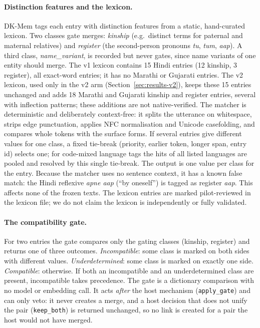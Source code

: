 \paragraph{Distinction features and the lexicon.} DK-Mem tags each entry with distinction features from a static, hand-curated lexicon. Two classes gate
merges: \emph{kinship} (e.g.\ distinct terms for paternal and maternal relatives) and \emph{register} (the second-person pronouns \emph{tu}, \emph{tum}, \emph{aap}).
A third class, \emph{name\_variant}, is recorded but never gates, since name variants of one entity should merge. The v1 lexicon contains 15 Hindi entries
(12 kinship, 3 register), all exact-word entries; it has no Marathi or Gujarati entries. The v2 lexicon, used only in the v2 arm
(Section~\ref{sec:results-v2}), keeps these 15 entries unchanged and adds 18 Marathi and Gujarati kinship and register entries, several with
inflection patterns; these additions are not native-verified. The matcher is deterministic and deliberately context-free: it
splits the utterance on whitespace, strips edge punctuation, applies NFC normalisation and Unicode casefolding, and compares whole tokens with the surface forms.
If several entries give different values for one class, a fixed tie-break (priority, earlier token, longer span, entry id) selects one; for code-mixed language
tags the hits of all listed languages are pooled and resolved by this single tie-break. The output is one value per class for the entry.
Because the matcher uses no sentence context, it has a known false match: the Hindi reflexive \emph{apne aap} (``by oneself'') is tagged as register \emph{aap}.
This affects none of the frozen texts. The lexicon entries are marked pilot-reviewed in the lexicon file; we do not claim the lexicon is independently or fully validated.

\paragraph{The compatibility gate.} For two entries the gate compares only the gating classes (kinship, register) and returns one of three outcomes.
\emph{Incompatible}: some class is marked on both sides with different values. \emph{Underdetermined}: some class is marked on exactly one side.
\emph{Compatible}: otherwise. If both an incompatible and an underdetermined class are present, incompatible takes precedence.
The gate is a dictionary comparison with no model or embedding call. It acts \emph{after} the host mechanism (\texttt{apply\_gate}) and can only veto: it never
creates a merge, and a host decision that does not unify the pair (\texttt{keep\_both}) is returned unchanged, so no link is created for a pair the host would not have merged.

